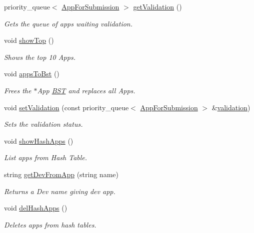 \begin{DoxyCompactItemize}
priority\-\_\-queue$<$ \hyperlink{class_app_for_submission}{App\-For\-Submission} $>$ \hyperlink{class_app_store_a9b8feaee60fbbbf83535eb64f1aabcb5}{get\-Validation} ()
\begin{DoxyCompactList}\small\item\em Gets the queue of apps waiting validation. \end{DoxyCompactList}\item 
void \hyperlink{class_app_store_a405cb336f26ae96307f0d4a4d950930c}{show\-Top} ()
\begin{DoxyCompactList}\small\item\em Shows the top 10 Apps. \end{DoxyCompactList}\item 
void \hyperlink{class_app_store_abe0bf19e7ef9e84ae724ce3df2eca117}{apps\-To\-Bst} ()
\begin{DoxyCompactList}\small\item\em Frees the $\ast$\-App \hyperlink{class_b_s_t}{B\-S\-T} and replaces all Apps. \end{DoxyCompactList}\item 
void \hyperlink{class_app_store_aa9e324faa5f15af0f2ac3227607716be}{set\-Validation} (const priority\-\_\-queue$<$ \hyperlink{class_app_for_submission}{App\-For\-Submission} $>$ \&\hyperlink{class_app_store_a5aac74886d1170f360838aaa8428652b}{validation})
\begin{DoxyCompactList}\small\item\em Sets the validation status. \end{DoxyCompactList}\item 
void \hyperlink{class_app_store_aadcc50b226aa1a04b2fcc3f6ad07b3fc}{show\-Hash\-Apps} ()
\begin{DoxyCompactList}\small\item\em List apps from Hash Table. \end{DoxyCompactList}\item 
string \hyperlink{class_app_store_ad1d0983b2b3fba66a2876bf7df7b9cd5}{get\-Dev\-From\-App} (string name)
\begin{DoxyCompactList}\small\item\em Returns a Dev name giving dev app. \end{DoxyCompactList}\item 
void \hyperlink{class_app_store_a2e5f4c42b55c2dcb4e7e42f3cd45900c}{del\-Hash\-Apps} ()
\begin{DoxyCompactList}\small\item\em Deletes apps from hash tables. \end{DoxyCompactList}\item 

\end{DoxyCompactItemize}
